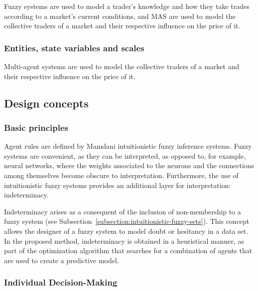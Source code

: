 \documentclass{ieeeaccess}
\begin{document}
Fuzzy systems are used to model a trader's knowledge and how they take trades according to a market's current conditions, and MAS are used to model the collective traders of a market and their respective influence on the price of it.

\subsubsection{Entities, state variables and scales}
\label{subsubsection:entities-state-variables-and-scales}

Multi-agent systems are used to model the collective traders of a market and their respective influence on the price of it.


\subsection{Design concepts}
\label{subsection:design-concepts}

\subsubsection{Basic principles}
\label{subsubsection:basic-principles}

Agent rules are defined by Mamdani intuitionistic fuzzy inference systems. Fuzzy systems	are convenient, as they can be interpreted, as opposed to, for example, neural	networks, where the weights associated to the neurons and the connections among	themselves become obscure to interpretation. Furthermore, the use of	intuitionistic fuzzy systems provides an additional layer for interpretation: indeterminacy.

Indeterminacy arises as a consequent of the inclusion of non-membership to a %
fuzzy system (see Subsection~\ref{subsection:intuitionistic-fuzzy-sets}). This concept allows the designer of a fuzzy system to model doubt or hesitancy in a data set. In the proposed method, indeterminacy is obtained in a heuristical manner, as part of the optimization algorithm that searches for a combination of agents that are used to create a predictive model.

\subsubsection{Individual Decision-Making}
\label{subsubsection:individual-decision-making}
\end{document}
